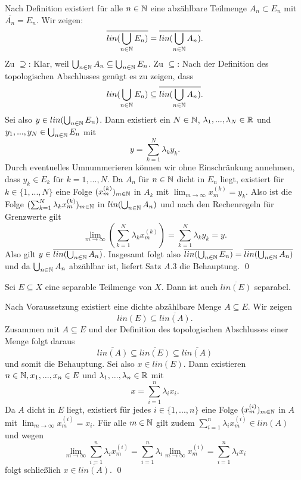 \begin{proof*}
    Nach Definition existiert für alle $n \in \mathbb{N}$ eine abzählbare Teilmenge $A_n \subset E_n$ mit $\overline{A_n} = E_n$. Wir zeigen: 
    $$
    \overline{lin(\bigcup_{n \in \mathbb{N}}E_n)} = \overline{lin(\bigcup_{n \in \mathbb{N}}A_n)}. 
    $$
    Zu $\supseteq$: Klar, weil $\bigcup_{n \in \mathbb{N}}A_n \subseteq \bigcup_{n \in \mathbb{N}}E_n$. \newline 
    Zu $\subseteq$: Nach der Definition des topologischen Abschlusses genügt es zu zeigen, dass
    $$
        lin(\bigcup_{n \in \mathbb{N}}E_n) \subseteq \overline{lin(\bigcup_{n \in \mathbb{N}}A_n)}.
    $$
    Sei also $y \in lin(\bigcup_{n \in \mathbb{N}}E_n)$. Dann existiert ein $N \in \mathbb{N}$, $\lambda_1,...,\lambda_N \in \mathbb{R}$ und $y_1,...,y_N \in \bigcup_{n \in \mathbb{N}}E_n$ mit 
    $$
        y = \sum_{k=1}^N\lambda_ky_k. 
    $$
    Durch eventuelles Umnummerieren können wir ohne Einschränkung annehmen, dass $y_k \in E_k$ für $k=1,...,N$. 
    Da $A_n$ für $n \in \mathbb{N}$ dicht in $E_n$ liegt, existiert für $k \in \{1,...,N\}$ eine Folge $(x_m^{(k)})_{m \in \mathbb{N}}$ in $A_k$ mit $\lim_{m \to \infty}x_m^{(k)} = y_k$. 
    Also ist die Folge $(\sum_{k=1}^N\lambda_k x_m^{(k)})_{m \in \mathbb{N}}$ in $lin(\bigcup_{n \in \mathbb{N}}A_n)$ und nach den Rechenregeln für Grenzwerte gilt 
    $$
        \lim_{m \to \infty}\left(\sum_{k=1}^N\lambda_k x_m^{(k)}\right) = \sum_{k=1}^N\lambda_ky_k = y. 
    $$
    Also gilt $y \in \overline{lin(\bigcup_{n \in \mathbb{N}}A_n)}$. 
    Insgesamt folgt also $\overline{lin(\bigcup_{n \in \mathbb{N}}E_n)} = \overline{lin(\bigcup_{n \in \mathbb{N}}A_n)}$ und da $\bigcup_{n \in \mathbb{N}}A_n$ abzählbar ist, liefert Satz $A.3$ die Behauptung. \qed
\end{proof*}

\begin{corollary}
    Sei $E \subseteq X$ eine separable Teilmenge von $X$. Dann ist auch $\overline{lin(E)}$ separabel. 
\end{corollary}
\begin{proof*}
    Nach Voraussetzung existiert eine dichte abzählbare Menge $A \subseteq E$. Wir zeigen 
    $$
        lin(E) \subseteq \overline{lin(A)}. 
    $$
    Zusammen mit $A \subseteq E$ und der Definition des topologischen Abschlusses einer Menge folgt daraus
    $$
        \overline{lin(A)} \subseteq \overline{lin(E)} \subseteq \overline{lin(A)}
    $$
    und somit die Behauptung. Sei also $x \in lin(E)$. Dann existieren $n \in \mathbb{N}, x_1,...,x_n \in E$ und $\lambda_1,...,\lambda_n \in \mathbb{R}$ mit
    $$
        x = \sum_{i=1}^n \lambda_i x_i. 
    $$ 
    Da $A$ dicht in $E$ liegt, existiert für jedes $i \in \{1,...,n\}$ eine Folge $(x_m^{(i)})_{m \in \mathbb{N}}$ in $A$ mit \mbox{$\lim_{m \to \infty}x_m^{(i)} = x_i$.}
    Für alle $m \in \mathbb{N}$ gilt zudem $\sum_{i=1}^n \lambda_i x_m^{(i)} \in lin(A)$ und wegen 
    $$
        \lim_{m \to \infty} \sum_{i=1}^n \lambda_i x_m^{(i)} = \sum_{i=1}^n \lambda_i \lim_{m \to \infty}x_m^{(i)} = \sum_{i=1}^n \lambda_i x_i
    $$
    folgt schließlich $x \in \overline{lin(A)}$. \qed 
\end{proof*}

